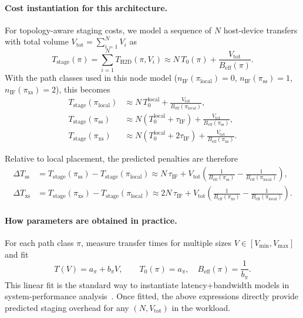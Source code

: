 \paragraph{Cost instantiation for this architecture.}
For topology-aware staging costs, we model a sequence of $N$ host-device
transfers with total volume $V_{\mathrm{tot}}=\sum_{i=1}^{N}V_i$ as
\[
  T_{\mathrm{stage}}(\pi)
  =
  \sum_{i=1}^{N} T_{\mathrm{H2D}}(\pi,V_i)
  \approx
  N\,T_0(\pi)+\frac{V_{\mathrm{tot}}}{B_{\mathrm{eff}}(\pi)}.
\]
With the path classes used in this node model
($n_{\mathrm{IF}}(\pi_{\mathrm{local}})=0$,
 $n_{\mathrm{IF}}(\pi_{\mathrm{ss}})=1$,
 $n_{\mathrm{IF}}(\pi_{\mathrm{xs}})=2$), this becomes
\begin{align*}
  T_{\mathrm{stage}}(\pi_{\mathrm{local}})
  &\approx
  N\,T_0^{\mathrm{local}}+\frac{V_{\mathrm{tot}}}{B_{\mathrm{eff}}(\pi_{\mathrm{local}})},\\
  T_{\mathrm{stage}}(\pi_{\mathrm{ss}})
  &\approx
  N\!\left(T_0^{\mathrm{local}}+\tau_{\mathrm{IF}}\right)
  +\frac{V_{\mathrm{tot}}}{B_{\mathrm{eff}}(\pi_{\mathrm{ss}})},\\
  T_{\mathrm{stage}}(\pi_{\mathrm{xs}})
  &\approx
  N\!\left(T_0^{\mathrm{local}}+2\tau_{\mathrm{IF}}\right)
  +\frac{V_{\mathrm{tot}}}{B_{\mathrm{eff}}(\pi_{\mathrm{xs}})}.
\end{align*}

Relative to local placement, the predicted penalties are therefore
\begin{align*}
  \Delta T_{\mathrm{ss}}
  &=
  T_{\mathrm{stage}}(\pi_{\mathrm{ss}})
  -T_{\mathrm{stage}}(\pi_{\mathrm{local}})
  \approx
  N\,\tau_{\mathrm{IF}}
  +V_{\mathrm{tot}}
   \!\left(
     \frac{1}{B_{\mathrm{eff}}(\pi_{\mathrm{ss}})}
     -\frac{1}{B_{\mathrm{eff}}(\pi_{\mathrm{local}})}
   \right),\\
  \Delta T_{\mathrm{xs}}
  &=
  T_{\mathrm{stage}}(\pi_{\mathrm{xs}})
  -T_{\mathrm{stage}}(\pi_{\mathrm{local}})
  \approx
  2N\,\tau_{\mathrm{IF}}
  +V_{\mathrm{tot}}
   \!\left(
     \frac{1}{B_{\mathrm{eff}}(\pi_{\mathrm{xs}})}
     -\frac{1}{B_{\mathrm{eff}}(\pi_{\mathrm{local}})}
   \right).
\end{align*}

\paragraph{How parameters are obtained in practice.}
For each path class $\pi$, measure transfer times for multiple sizes
$V\in[V_{\min},V_{\max}]$ and fit
\[
  T(V)=a_\pi + b_\pi V,
  \qquad
  T_0(\pi)=a_\pi,\quad B_{\mathrm{eff}}(\pi)=\frac{1}{b_\pi}.
\]
This linear fit is the standard way to instantiate latency+bandwidth models in
system-performance analysis~\cite{hockney1988parallel,jain1991art}.
Once fitted, the above expressions directly provide predicted staging overhead
for any $(N,V_{\mathrm{tot}})$ in the workload.

